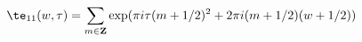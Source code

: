 \begin{equation}
\te_{11}(w,\tau)=\sum_{m\in{\bf Z}}
{\rm exp}(\pi i \tau (m+1/2)^2 + 2\pi i (m+1/2)(w+1/2))
\label{TH}
\end{equation}

